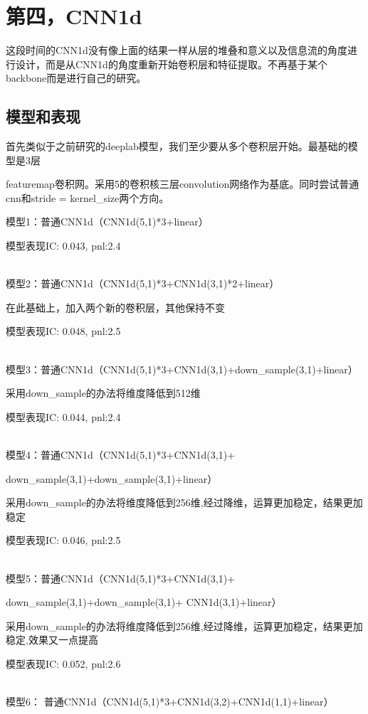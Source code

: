 \documentclass[11pt]{ctexart}
\begin{document}
\section{第四，CNN1d}

这段时间的CNN1d没有像上面的结果一样从层的堆叠和意义以及信息流的角度进行设计，而是从CNN1d的角度重新开始卷积层和特征提取。不再基于某个backbone而是进行自己的研究。

\subsection{模型和表现}

首先类似于之前研究的deeplab模型，我们至少要从多个卷积层开始。最基础的模型是3层 \par featuremap卷积网。采用5的卷积核三层convolution网络作为基底。同时尝试普通cnn和stride = kernel\_size两个方向。

模型1：普通CNN1d（CNN1d(5,1)*3+linear）

模型表现{\kaishu \small IC: 0.043, pnl:2.4}

~\\
模型2：普通CNN1d（CNN1d(5,1)*3+CNN1d(3,1)*2+linear）

在此基础上，加入两个新的卷积层，其他保持不变

模型表现{\kaishu \small IC: 0.048, pnl:2.5}


~\\
模型3：普通CNN1d（CNN1d(5,1)*3+CNN1d(3,1)+down\_sample(3,1)+linear）

采用down\_sample的办法将维度降低到512维

模型表现{\kaishu \small IC: 0.044, pnl:2.4}


~\\
模型4：普通CNN1d（CNN1d(5,1)*3+CNN1d(3,1)+

down\_sample(3,1)+down\_sample(3,1)+linear）

采用down\_sample的办法将维度降低到256维,经过降维，运算更加稳定，结果更加稳定

模型表现{\kaishu \small IC: 0.046, pnl:2.5}

~\\
模型5：普通CNN1d（CNN1d(5,1)*3+CNN1d(3,1)+

down\_sample(3,1)+down\_sample(3,1)+ CNN1d(3,1)+linear）

采用down\_sample的办法将维度降低到256维,经过降维，运算更加稳定，结果更加稳定,效果又一点提高

模型表现{\kaishu \small IC: 0.052, pnl:2.6}

~\\
模型6：
普通CNN1d（CNN1d(5,1)*3+CNN1d(3,2)+CNN1d(1,1)+linear）
\end{document}
